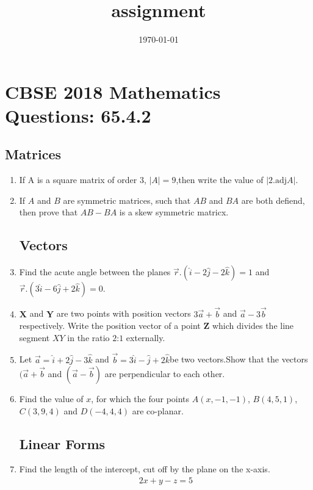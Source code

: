 \documentclass[10pt,-letter paper]{article}
\let\vec\mathbf{}
\let\vec\mathbf{}
\let\vec\mathbf{}
\providecommand{\brak}[1]{\ensuremath{\left(#1\right)}}
\begin{document}
\title{assignment}
\date{\today}
\maketitle
\section*{CBSE 2018 Mathematics Questions: 65.4.2}
\subsection*{Matrices}
\begin{enumerate}
\item If A is a square matrix of order $3$, $|A|=9$,then write the value of $|2.\text{adj} A|$.
\item If $A$ and $B$ are symmetric matrices, such that $AB$ and $BA$ are both defiend, then prove that $AB-BA$ is a skew symmetric matricx.
\subsection*{Vectors}
\item Find the acute angle between the planes $\overrightarrow{r}.(\hat{i}-2\hat{j}-2\hat{k})=1$ and $\overrightarrow{r}.(3\hat{i}-6\hat{j}+2\hat{k})=0$.
\item $\vec{X}$ and $\vec{Y}$ are two points with position vectors $3 \overrightarrow{a} + \overrightarrow{b}$ and $\overrightarrow{a} - 3 \overrightarrow{b}$ respectively. Write the position vector of a point $\vec{Z}$ which divides the line segment $XY$ in the ratio $2$:$1$ externally.
\item Let $\overrightarrow{a}=\hat{i}+2\hat{j}-3\hat{k}$ and $\overrightarrow{b}=3\hat{i}-\hat{j}+2\hat{k}$be two vectors.Show that the vectors $(\overrightarrow{a} + \overrightarrow{b}$ and $(\overrightarrow{a} - \overrightarrow{b})$ are perpendicular to each other.
\item Find the value of $x$, for which the four points $A\brak{x,-1,-1}$, $B\brak{4,5,1}$,$C\brak{3,9,4}$ and $D\brak{-4,4,4}$ are co-planar.
\subsection*{Linear Forms}
\item Find the length of the intercept, cut off by the plane on the x-axis.                                                                             \begin{align*}                                                                2x+y-z=5                                                          \end{align*}                                            

\end{enumerate}
\end{document}

